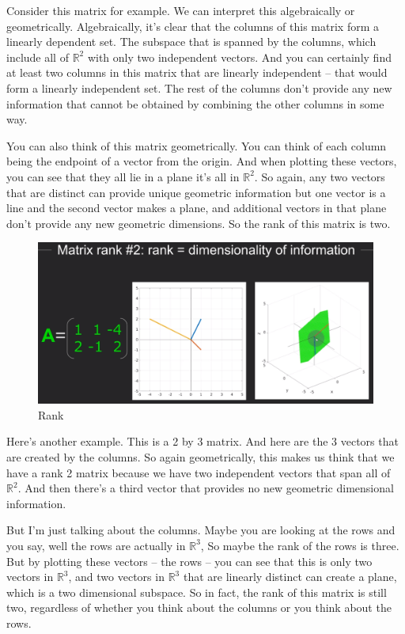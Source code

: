 \documentclass[fleqn,10pt]{olplainarticle}
\theoremstyle{definition}
\theoremstyle{remark}
\begin{document}
Consider this matrix for example. We can interpret this algebraically or geometrically. Algebraically, it's clear that the columns of this matrix form a linearly dependent set. The subspace that is spanned by the columns, which include all of $\mathbb{R}^2$ with only two independent vectors. And you can certainly find at least two columns in this matrix that are linearly independent -- that would form a linearly independent set. The rest of the columns don't provide any new information that cannot be obtained by combining the other columns in some way.

You can also think of this matrix geometrically. You can think of each column being the endpoint of a vector from the origin. And when plotting these vectors, you can see that they all lie in a plane it's all in $\mathbb{R}^2$. So again, any two vectors that are distinct can provide unique geometric information but one vector is a line and the second vector makes a plane, and additional vectors in that plane don't provide any new geometric dimensions. So the rank of this matrix is two.

\begin{figure}[ht]
	\centering
	\includegraphics[width=0.5\linewidth]{images/rank-03.png}
	\caption{Rank}
	\label{fig:rank_03}
\end{figure}

Here's another example. This is a 2 by 3 matrix. And here are the 3 vectors that are created by the columns. So again geometrically, this makes us think that we have a rank 2 matrix because we have two independent vectors that span all of $\mathbb{R}^2$. And then there's a third vector that provides no new geometric dimensional information.

But I'm just talking about the columns. Maybe you are looking at the rows and you say, well the rows are actually in $\mathbb{R}^3$, So maybe the rank of the rows is three. But by plotting these vectors -- the rows -- you can see that this is only two vectors in $\mathbb{R}^3$, and two vectors in $\mathbb{R}^3$ that are linearly distinct can create a plane, which is a two dimensional subspace. So in fact, the rank of this matrix is still two, regardless of whether you think about the columns or you think about the rows.
\end{document}
